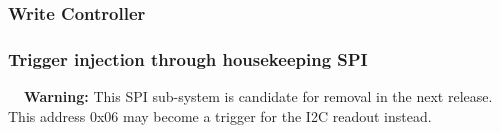 \documentclass[a4paper,indent]{paper}
\newenvironment{warning}
{\par\begin{mdframed}[linewidth=2pt,linecolor=orange,backgroundcolor=orange!10]%
    \begin{list}{}{\leftmargin=0mm}\item[\bf\danger{}~~Warning: ]}
  {\end{list}\end{mdframed}\par}
\begin{document}
\subsubsection{Write Controller}
%
%
%
%
%
%
%
%



\subsubsection{Trigger injection through housekeeping \ac{SPI}}
\begin{warning}
  This \ac{SPI} sub-system is candidate for removal in the next release.
  This address 0x06 may become a trigger for the \ac{I2C} readout instead.
\end{warning}
\end{document}
